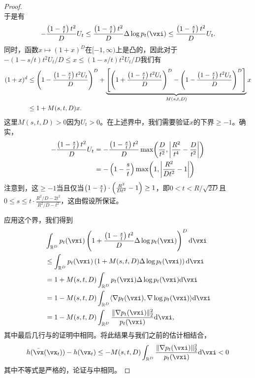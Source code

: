 \documentclass[../../book-main.tex]{subfiles}
\begin{document}
\begin{proof}
\begin{equation}
    \end{equation}
    于是有
    \begin{equation}
        -\frac{\bp{1 - \frac{s}{t}}t^{2}}{D}U_{t} \leq \frac{\bp{1 - \frac{s}{t}}t^{2}}{D}\Delta \log p_{t}(\vxi) \leq \frac{\bp{1 - \frac{s}{t}}t^{2}}{D}U_{t}.
    \end{equation}
    同时，函数\(x \mapsto (1 + x)^{D}\)在\([-1, \infty)\)上是凸的，因此对于
    \(-(1-s/t)t^{2}U_{t}/D \leq x \leq (1-s/t)t^{2}U_{t}/D\)我们有
    \begin{align}
        (1 + x)^{d} 
        &\leq \left(1 - \frac{\left(1 - \frac{s}{t}\right)t^{2}U_{t}}{D}\right)^{D} + \underbrace{\left[\left(1 + \frac{\left(1 - \frac{s}{t}\right)t^{2}U_{t}}{D}\right)^{D} - \left(1 - \frac{\left(1 - \frac{s}{t}\right)t^{2}U_{t}}{D}\right)^{D}\right]}_{M(s, t, D)}x \\ 
        &\leq 1 + M(s, t, D)x.
    \end{align}
    这里\(M(s, t, D) > 0\)因为\(U_{t} > 0\)。在上述界中，我们需要验证\(x\)的下界\(\geq -1\)。确实，
    \begin{align}
        -\frac{\bp{1 - \frac{s}{t}}t^{2}}{D}U_{t}
        &= -\frac{\bp{1 - \frac{s}{t}}t^{2}}{D}\max\rp{\frac{D}{t^{2}}, \abs*{\frac{R^{2}}{t^{4}} - \frac{D}{t^{2}}}} \\ 
        &= -\bp{1 - \frac{s}{t}}\max\rp{1, \abs*{\frac{R^{2}}{Dt^{2}} - 1}}
    \end{align}
    注意到，这\(\geq -1\)当且仅当\(\left(1 - \frac{s}{t}\right)\cdot\left(\frac{R^{2}}{Dt^{2}} - 1\right) \geq 1\)，即\(0 < t < R/\sqrt{2D}\)且\(0 \leq s \leq t\cdot\frac{R^{2}/D - 2t^{2}}{R^{2}/D - t^{2}}\)，这由假设所保证。
    
    应用这个界，我们得到
    \begin{align}
        &\int_{\R^{D}} p_{t}(\vxi)\bp{1 + \frac{\bp{1 - \frac{s}{t}}t^{2}}{D}\Delta \log p_{t}(\vxi)}^{D}\odif{\vxi} \\ 
        &\leq \int_{\R^{D}}p_{t}(\vxi)\bp{1 + M(s, t, D)\Delta \log p_{t}(\vxi)}\odif{\vxi} \\
        &= 1 + M(s, t, D)\int_{\R^{D}}p_{t}(\vxi)\Delta \log p_{t}(\vxi)\odif{\vxi} \\
        &= 1 - M(s, t, D)\int_{\R^{D}}\ip{\nabla p_{t}(\vxi)}{\nabla\log p_{t}(\vxi)}\odif{\vxi} \\
        &= 1 - M(s, t, D)\int_{\R^{D}}\frac{\norm{\nabla p_{t}(\vxi)}_{2}^{2}}{p_{t}(\vxi)}\odif{\vxi},
    \end{align}
    其中最后几行与的证明中相同。将此结果与我们之前的估计相结合，
    \begin{equation}
        h(\bar{\vx}(\vx_{t})) - h(\vx_{t}) \leq - M(s, t, D)\int_{\R^{D}}\frac{\norm{\nabla p_{t}(\vxi)}_{2}^{2}}{p_{t}(\vxi)}\odif{\vxi} < 0
    \end{equation}
    其中不等式是严格的，论证与中相同。
\end{proof}
\end{document}
